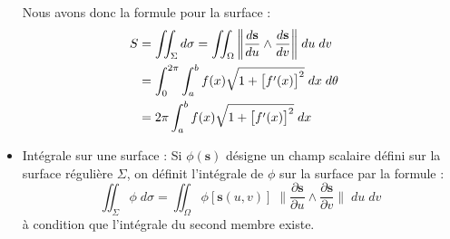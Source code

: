 \documentclass[a4paper]{article}
\begin{document}
\begin{itemize}
\begin{siderules}
\end{siderules}


Nous avons donc la formule pour la surface : 
\begin{align*}
S &= \iint_\Sigma d \sigma = \iint_\Omega \bigg\| \frac{d \textbf{s}}{d u} \wedge \frac{d \textbf{s}}{d v} \bigg\| \; d u \; d v \cr
&= \int_0^{2\pi} \int_a^b f(x) \sqrt{1 + \big[f'(x)\big]^2} \; d x \; d \theta \cr
&= 2 \pi \int_a^b f(x) \sqrt{1 + \big[ f'(x) \big]^2} \; d x
\end{align*}






\item Intégrale sur une surface : Si $ \phi (\textbf{s}) $ désigne un champ scalaire défini sur la surface régulière $ \Sigma $, on définit l'intégrale de $ \phi $ sur la surface par la formule : 
\[ \iint_\Sigma \phi \; d \sigma = \iint_\Omega \phi[\textbf{s}(u, v)] \; \bigg\| \frac{\partial \textbf{s}}{\partial u} \wedge \frac{\partial \textbf{s}}{\partial v} \bigg\| \; d u \; d v \]
à condition que l'intégrale du second membre existe.







\end{itemize}
\end{document}
